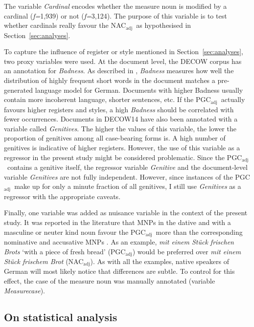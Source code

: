 \documentclass[USenglish]{article}
\newcommand{\Sub}[1]{\ensuremath{\mathrm{_{#1}}}}
\newcommand{\NACa}{NAC\Sub{adj}}
\newcommand{\PGCa}{PGC\Sub{adj}}
\begin{document}
The variable \textit{Cardinal} encodes whether the measure noun is modified by a cardinal (\textit{f=}1,939) or not (\textit{f=}3,124).
The purpose of this variable is to test whether cardinals really favour the \NACa\ as hypothesised in Section~\ref{sec:analyses}.

To capture the influence of register or style mentioned in Section~\ref{sec:analyses}, two proxy variables were used.
At the document level, the DECOW corpus has an annotation for \textit{Badness}.
As described in \cite{SchaeferEa2013}, \textit{Badness} measures how well the distribution of highly frequent short words in the document matches a pre-generated language model for German.
Documents with higher Badness usually contain more incoherent language, shorter sentences, etc.
If the \PGCa\ actually favours higher registers and styles, a high \textit{Badness} should be correlated with fewer occurrences.
Documents in DECOW14 have also been annotated with a variable called \textit{Genitives}.
The higher the values of this variable, the lower the proportion of genitives among all case-bearing forms is.
A high number of genitives is indicative of higher registers.
However, the use of this variable as a regressor in the present study might be considered problematic.
Since the \PGCa\ contains a genitive itself, the regressor variable \textit{Genitive} and the document-level variable \textit{Genitives} are not fully independent.
However, since instances of the \PGCa\ make up for only a minute fraction of all genitives, I still use \textit{Genitives} as a regressor with the appropriate caveats.

Finally, one variable was added as nuisance variable in the context of the present study.
It was reported in the literature that MNPs in the dative and with a masculine or neuter kind noun favour the \PGCa\ more than the corresponding nominative and accusative MNPs \citep{Hentschel1993,Zimmer2015}.
As an example, \textit{mit einem Stück frischen Brots} `with a piece of fresh bread' (\PGCa) would be preferred over \textit{mit einem Stück frischem Brot} (\NACa).
As with all the examples, native speakers of German will most likely notice that differences are subtle.
To control for this effect, the case of the measure noun was manually annotated (variable \textit{Measurecase}).



\subsection{On statistical analysis}
\label{sec:rightstatistics}
\end{document}
